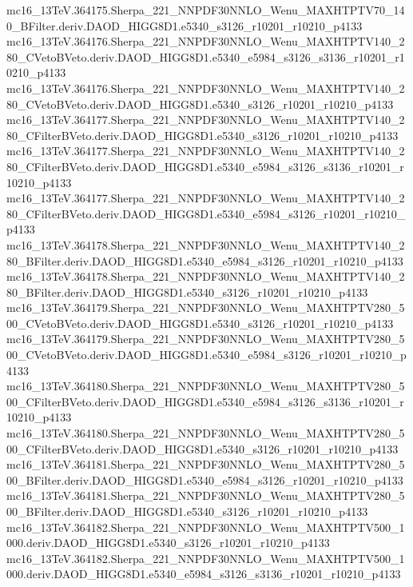 mc16_13TeV.364175.Sherpa_221_NNPDF30NNLO_Wenu_MAXHTPTV70_140_BFilter.deriv.DAOD_HIGG8D1.e5340_s3126_r10201_r10210_p4133 \\
mc16_13TeV.364176.Sherpa_221_NNPDF30NNLO_Wenu_MAXHTPTV140_280_CVetoBVeto.deriv.DAOD_HIGG8D1.e5340_e5984_s3126_s3136_r10201_r10210_p4133 \\
mc16_13TeV.364176.Sherpa_221_NNPDF30NNLO_Wenu_MAXHTPTV140_280_CVetoBVeto.deriv.DAOD_HIGG8D1.e5340_s3126_r10201_r10210_p4133 \\
mc16_13TeV.364177.Sherpa_221_NNPDF30NNLO_Wenu_MAXHTPTV140_280_CFilterBVeto.deriv.DAOD_HIGG8D1.e5340_s3126_r10201_r10210_p4133 \\
mc16_13TeV.364177.Sherpa_221_NNPDF30NNLO_Wenu_MAXHTPTV140_280_CFilterBVeto.deriv.DAOD_HIGG8D1.e5340_e5984_s3126_s3136_r10201_r10210_p4133 \\
mc16_13TeV.364177.Sherpa_221_NNPDF30NNLO_Wenu_MAXHTPTV140_280_CFilterBVeto.deriv.DAOD_HIGG8D1.e5340_e5984_s3126_r10201_r10210_p4133 \\
mc16_13TeV.364178.Sherpa_221_NNPDF30NNLO_Wenu_MAXHTPTV140_280_BFilter.deriv.DAOD_HIGG8D1.e5340_e5984_s3126_r10201_r10210_p4133 \\
mc16_13TeV.364178.Sherpa_221_NNPDF30NNLO_Wenu_MAXHTPTV140_280_BFilter.deriv.DAOD_HIGG8D1.e5340_s3126_r10201_r10210_p4133 \\
mc16_13TeV.364179.Sherpa_221_NNPDF30NNLO_Wenu_MAXHTPTV280_500_CVetoBVeto.deriv.DAOD_HIGG8D1.e5340_s3126_r10201_r10210_p4133 \\
mc16_13TeV.364179.Sherpa_221_NNPDF30NNLO_Wenu_MAXHTPTV280_500_CVetoBVeto.deriv.DAOD_HIGG8D1.e5340_e5984_s3126_r10201_r10210_p4133 \\
mc16_13TeV.364180.Sherpa_221_NNPDF30NNLO_Wenu_MAXHTPTV280_500_CFilterBVeto.deriv.DAOD_HIGG8D1.e5340_e5984_s3126_s3136_r10201_r10210_p4133 \\
mc16_13TeV.364180.Sherpa_221_NNPDF30NNLO_Wenu_MAXHTPTV280_500_CFilterBVeto.deriv.DAOD_HIGG8D1.e5340_s3126_r10201_r10210_p4133 \\
mc16_13TeV.364181.Sherpa_221_NNPDF30NNLO_Wenu_MAXHTPTV280_500_BFilter.deriv.DAOD_HIGG8D1.e5340_e5984_s3126_r10201_r10210_p4133 \\
mc16_13TeV.364181.Sherpa_221_NNPDF30NNLO_Wenu_MAXHTPTV280_500_BFilter.deriv.DAOD_HIGG8D1.e5340_s3126_r10201_r10210_p4133 \\
mc16_13TeV.364182.Sherpa_221_NNPDF30NNLO_Wenu_MAXHTPTV500_1000.deriv.DAOD_HIGG8D1.e5340_s3126_r10201_r10210_p4133 \\
mc16_13TeV.364182.Sherpa_221_NNPDF30NNLO_Wenu_MAXHTPTV500_1000.deriv.DAOD_HIGG8D1.e5340_e5984_s3126_s3136_r10201_r10210_p4133 \\
